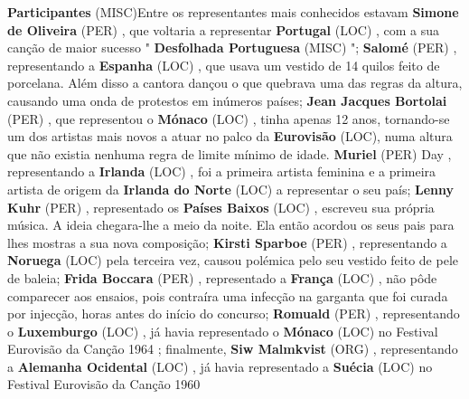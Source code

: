 \documentclass[12pt,a4paper]{article}
\begin{document}
\textbf{Participantes} (MISC)Entre os representantes mais conhecidos estavam \textbf{Simone de Oliveira} (PER) , que voltaria a representar \textbf{Portugal} (LOC) , com a sua canção de maior sucesso " \textbf{Desfolhada Portuguesa} (MISC) "; \textbf{Salomé} (PER) , representando a \textbf{Espanha} (LOC) , que usava um vestido de 14 quilos feito de porcelana. Além disso a cantora dançou o que quebrava uma das regras da altura, causando uma onda de protestos em inúmeros países; \textbf{Jean Jacques Bortolai} (PER) , que representou o \textbf{Mónaco} (LOC) , tinha apenas 12 anos, tornando-se um dos artistas mais novos a atuar no palco da \textbf{Eurovisão} (LOC), numa altura que não existia nenhuma regra de limite mínimo de idade. \textbf{Muriel} (PER) Day , representando a \textbf{Irlanda} (LOC) , foi a primeira artista feminina e a primeira artista de origem da \textbf{Irlanda do Norte} (LOC) a representar o seu país; \textbf{Lenny Kuhr} (PER) , representado os \textbf{Países Baixos} (LOC) , escreveu sua própria música. A ideia chegara-lhe a meio da noite. Ela então acordou os seus pais para lhes mostras a sua nova composição; \textbf{Kirsti Sparboe} (PER) , representando a \textbf{Noruega} (LOC) pela terceira vez, causou polémica pelo seu vestido feito de pele de baleia; \textbf{Frida Boccara} (PER) , representado a \textbf{França} (LOC) , não pôde comparecer aos ensaios, pois contraíra uma infecção na garganta que foi curada por injecção, horas antes do início do concurso; \textbf{Romuald} (PER) , representando o \textbf{Luxemburgo} (LOC) , já havia representado o \textbf{Mónaco} (LOC) no Festival Eurovisão da Canção 1964 ; finalmente, \textbf{Siw Malmkvist} (ORG) , representando a \textbf{Alemanha Ocidental} (LOC) , já havia representado a \textbf{Suécia} (LOC) no Festival Eurovisão da Canção 1960
\end{document}
